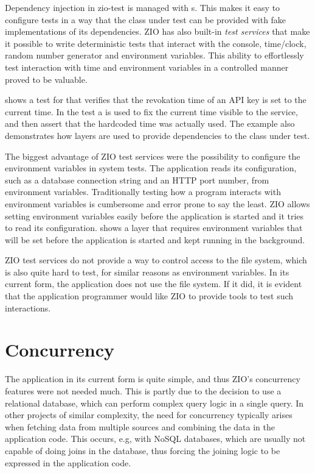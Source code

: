 Dependency injection in zio-test is managed with s. This makes it easy to configure tests in a way that the class under test can be provided with fake implementations of its dependencies. ZIO has also built-in \emph{test services} that make it possible to write deterministic tests that interact with the console, time/clock, random number generator and environment variables. This ability to effortlessly test interaction with time and environment variables in a controlled manner proved to be valuable.

 shows a test for  that verifies that the revokation time of an API key is set to the current time. In the test a  is used to fix the current time visible to the service, and then assert that the hardcoded time was actually used. The example also demonstrates how layers are used to provide dependencies to the class under test.



The biggest advantage of ZIO test services were the possibility to configure the environment variables in system tests. The application reads its configuration, such as a database connection string and an HTTP port number, from environment variables. Traditionally testing how a program interacts with environment variables is cumbersome and error prone to say the least. ZIO  allows setting environment variables easily before the application is started and it tries to read its configuration.  shows a layer that requires environment variables that will be set before the application is started and kept running in the background.



ZIO test services do not provide a way to control access to the file system, which is also quite hard to test, for similar reasons as environment variables. In its current form, the application does not use the file system. If it did, it is evident that the application programmer would like ZIO to provide tools to test such interactions.


\section{Concurrency}
The application in its current form is quite simple, and thus ZIO's concurrency features were not needed much. This is partly due to the decision to use a relational database, which can perform complex query logic in a single query. In other projects of similar complexity, the need for concurrency typically arises when fetching data from multiple sources and combining the data in the application code. This occurs, e.g, with NoSQL databases, which are usually not capable of doing joins in the database, thus forcing the joining logic to be expressed in the application code.

